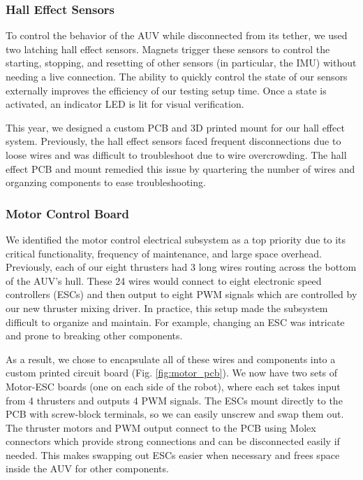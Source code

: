 \documentclass[conference]{IEEEtran}
\begin{document}
\subsubsection{Hall Effect Sensors}
\label{sssec:hall_effects}
To control the behavior of the AUV while disconnected from its tether, we used two latching hall effect sensors. Magnets trigger these sensors to control the starting, stopping, and resetting of other sensors (in particular, the IMU) without needing a live connection. The ability to quickly control the state of our sensors externally improves the efficiency of our testing setup time. Once a state is activated, an indicator LED is lit for visual verification. 

This year, we designed a custom PCB and 3D printed mount for our hall effect system. Previously, the hall effect sensors faced frequent disconnections due to loose wires and was difficult to troubleshoot due to wire overcrowding. The hall effect PCB and mount remedied this issue by quartering the number of wires and organzing components to ease troubleshooting.

\subsubsection{Motor Control Board}
\label{sssec:motor_board}
We identified the motor control electrical subsystem as a top priority due to its critical functionality, frequency of maintenance, and large space overhead. Previously, each of our eight thrusters had 3 long wires routing across the bottom of the AUV's hull. These 24 wires would connect to eight electronic speed controllers (ESCs) and then output to eight PWM signals which are controlled by our new thruster mixing driver. In practice, this setup made the subsystem difficult to organize and maintain. For example, changing an ESC was intricate and prone to breaking other components. 

As a result, we chose to encapsulate all of these wires and components into a custom printed circuit board (Fig. \ref{fig:motor_pcb}). We now have two sets of Motor-ESC boards (one on each side of the robot), where each set takes input from 4 thrusters and outputs 4 PWM signals. The ESCs mount directly to the PCB with screw-block terminals, so we can easily unscrew and swap them out. The thruster motors and PWM output connect to the PCB using Molex connectors which provide strong connections and can be disconnected easily if needed. This makes swapping out ESCs easier when necessary and frees space inside the AUV for other components.
\end{document}
